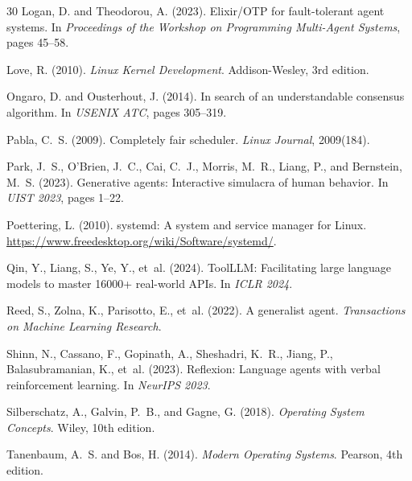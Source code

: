 \documentclass[12pt,a4paper]{article}
\theoremstyle{definition}
\theoremstyle{remark}
\begin{document}
\begin{thebibliography}{30}
Logan, D. and Theodorou, A. (2023).
\newblock Elixir/OTP for fault-tolerant agent systems.
\newblock In \emph{Proceedings of the Workshop on Programming Multi-Agent Systems}, pages 45--58.

Love, R. (2010).
\newblock \emph{Linux Kernel Development}.
\newblock Addison-Wesley, 3rd edition.

Ongaro, D. and Ousterhout, J. (2014).
\newblock In search of an understandable consensus algorithm.
\newblock In \emph{USENIX ATC}, pages 305--319.

Pabla, C.~S. (2009).
\newblock Completely fair scheduler.
\newblock \emph{Linux Journal}, 2009(184).

Park, J.~S., O'Brien, J.~C., Cai, C.~J., Morris, M.~R., Liang, P., and Bernstein, M.~S. (2023).
\newblock Generative agents: Interactive simulacra of human behavior.
\newblock In \emph{UIST 2023}, pages 1--22.

Poettering, L. (2010).
\newblock systemd: A system and service manager for Linux.
\newblock \url{https://www.freedesktop.org/wiki/Software/systemd/}.

Qin, Y., Liang, S., Ye, Y., et~al. (2024).
\newblock ToolLLM: Facilitating large language models to master 16000+ real-world APIs.
\newblock In \emph{ICLR 2024}.

Reed, S., Zolna, K., Parisotto, E., et~al. (2022).
\newblock A generalist agent.
\newblock \emph{Transactions on Machine Learning Research}.

Shinn, N., Cassano, F., Gopinath, A., Sheshadri, K.~R., Jiang, P., Balasubramanian, K., et~al. (2023).
\newblock Reflexion: Language agents with verbal reinforcement learning.
\newblock In \emph{NeurIPS 2023}.

Silberschatz, A., Galvin, P.~B., and Gagne, G. (2018).
\newblock \emph{Operating System Concepts}.
\newblock Wiley, 10th edition.

Tanenbaum, A.~S. and Bos, H. (2014).
\newblock \emph{Modern Operating Systems}.
\newblock Pearson, 4th edition.


\end{thebibliography}
\end{document}

